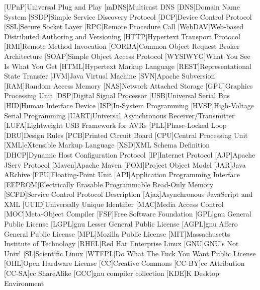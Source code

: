 \begin{acronym}[WYSIWYG]	%

[UPnP]{Universal Plug and Play}
[mDNS]{Multicast DNS}
[DNS]{Domain Name System}
[SSDP]{Simple Service Discovery Protocol}
[DCP]{Device Control Protocol}
[SSL]{Secure Socket Layer}
[RPC]{Remote Procedure Call}
[WebDAV]{Web-based Distributed Authoring and Versioning}
[HTTP]{Hypertext Transport Protocol}
[RMI]{Remote Method Invocation}
[CORBA]{Common Object Request Broker Architecture}
[SOAP]{Simple Object Access Protocol}
[WYSIWYG]{What You See Is What You Get}
[HTML]{Hypertext Markup Language}
[REST]{Representational State Transfer}
[JVM]{Java Virtual Machine}
[SVN]{Apache Subversion}
[RAM]{Random Access Memory}
[NAS]{Network Attached Storage}
[GPU]{Graphics Processing Unit}
[DSP]{Digital Signal Processor}
[USB]{Universal Serial Bus}
[HID]{Human Interface Device}
[ISP]{In-System Programming}
[HVSP]{High-Voltage Serial Programming}
[UART]{Universal Asynchronous Receiver/Transmitter}
[LUFA]{Lightweight USB Framework for AVRs}
[PLL]{Phase-Locked Loop}
[DRU]{Design Rules}
[PCB]{Printed Circuit Board}
[CPU]{Central Processing Unit}
[XML]{eXtensible Markup Language}
[XSD]{XML Schema Definition}
[DHCP]{Dynamic Host Configuration Protocol}
[IP]{Internet Protocol}
[AJP]{Apache JServ Protocol}
[Maven]{Apache Maven}
[POM]{Project Object Model}
[JAR]{Java ARchive}
[FPU]{Floating-Point Unit}
[API]{Application Programming Interface}
[EEPROM]{Electrically Erasable Programmable Read-Only Memory}
[SCPD]{Service Control Protocol Description}
[Ajax]{Asynchronous JavaScript and XML}
[UUID]{Universally Unique Identifier}
[MAC]{Media Access Control}
[MOC]{Meta-Object Compiler}
[FSF]{Free Software Foundation}
[GPL]{\acs{gnu} General Public License}
[LGPL]{\acs{gnu} Lesser General Public License}
[AGPL]{\acs{gnu} Affero General Public License}
[MPL]{Mozilla Public License}
[MIT]{Massachusetts Institute of Technology}
[RHEL]{Red Hat Enterprise Linux}
[GNU]{GNU's Not Unix!}
[SL]{Scientific Linux}
[WTFPL]{Do What The Fuck You Want Public License}
[OHL]{Open Hardware License}
[CC]{Creative Commons}
[CC-BY]{\acl{cc} Attribution}
[CC-SA]{\acl{cc} ShareAlike}
[GCC]{\acs{gnu} compiler collection}
[KDE]{K Desktop Environment}
\end{acronym}

\acresetall

